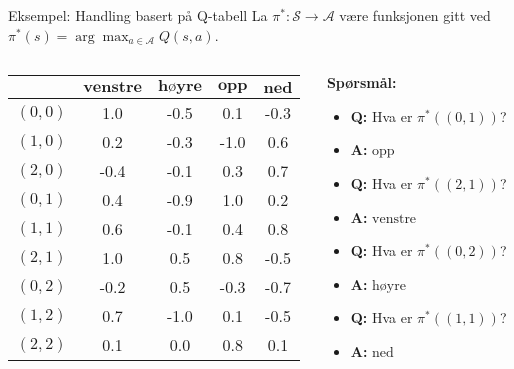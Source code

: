 \documentclass[UKenglish]{beamer}
\begin{document}
\begin{frame}{Eksempel: Handling basert på Q-tabell}
	La $\pi^*\colon\mathcal{S}\to\mathcal{A}$ være funksjonen gitt ved $\pi^*(s) = \arg\max_{a\in\mathcal{A}}Q(s,a)$.
	\begin{columns}
		\begin{column}{0.5\textwidth}
			\begin{table}[!hbt]
				\centering
				\def\arraystretch{1.1}
				\setlength{}
				\begin{tabular}{|c|c|c|c|c|}\hline
					\diagbox{$\textbf{s}$}{$\textbf{a}$} & $\textbf{venstre}$ & $\textbf{høyre}$ & $\textbf{opp}$ & $\textbf{ned}$\\ \hline
					$(0,0)$ & 1.0 & -0.5 & 0.1 & -0.3 \\ \hline
					$(1,0)$ & 0.2 & -0.3 & -1.0 & 0.6 \\ \hline
					$(2,0)$ & -0.4 & -0.1 & 0.3 & 0.7 \\ \hline
					$(0,1)$ & 0.4 & -0.9 & 1.0 & 0.2 \\ \hline
					$(1,1)$ & 0.6 & -0.1 & 0.4 & 0.8 \\ \hline
					$(2,1)$ & 1.0 & 0.5 & 0.8 & -0.5 \\ \hline
					$(0,2)$ & -0.2 & 0.5 & -0.3 & -0.7 \\ \hline
					$(1,2)$ & 0.7 & -1.0 & 0.1 & -0.5 \\ \hline
					$(2,2)$ & 0.1 & 0.0 & 0.8 & 0.1 \\ \hline
				\end{tabular}
			\end{table}
		\end{column}
		\begin{column}{0.5\textwidth}%
			
			\textbf{Spørsmål:}
					
			\begin{itemize}
			\item\textbf{Q:} Hva er $\pi^*((0,1))$?
			\pause
			\item\textbf{A:} $\text{opp}$
			\pause
			\item\textbf{Q:} Hva er $\pi^*((2,1))$?
			\pause
			\item\textbf{A:} $\text{venstre}$
			\pause
			\item\textbf{Q:} Hva er $\pi^*((0,2))$?
			\pause
			\item\textbf{A:} $\text{høyre}$
			\pause
			\item\textbf{Q:} Hva er $\pi^*((1,1))$?
			\pause
			\item\textbf{A:} $\text{ned}$
			\end{itemize}	
		\end{column}
	\end{columns}
\end{frame}
\end{document}
